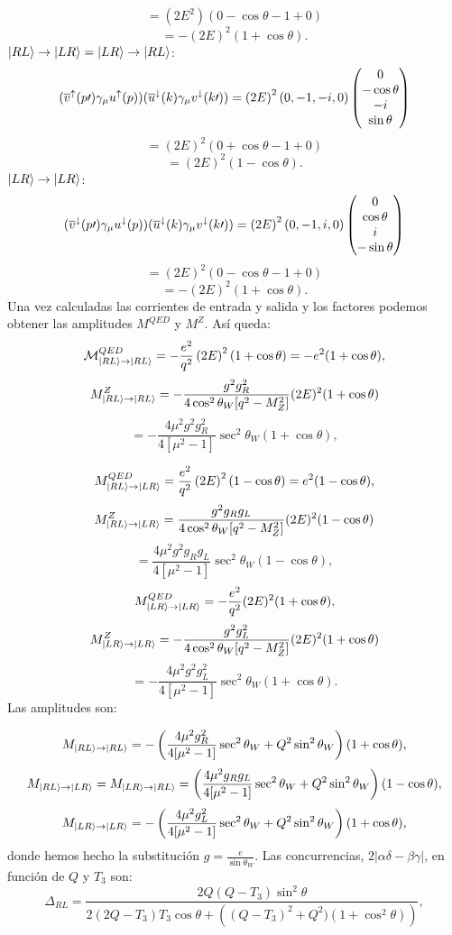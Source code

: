 \documentclass{article}
\theoremstyle{plain}
\theoremstyle{definition}
\begin{document}
	\[= (2E^2)\left(
	0-\cos\theta -1+
	0
	\right) \]	
	\[=-(2E)^2(1+\cos\theta)\text{.}\]
	\underline{\(\ket{RL}\rightarrow\ket{LR}=\ket{LR}\rightarrow\ket{RL}\)}:\newline\newline
	\[
	(\overline{v}^\uparrow(p\prime)\gamma_{\mu}u^\uparrow(p))(\overline{u}^\downarrow(k)\gamma_{\mu}v^\downarrow(k\prime)) = \left(2E\right)^2\left(0,-1,-i,0\right)\left(\begin{array}{@{}c@{}}
	0\\
	-\cos\theta\\
	-i\\
	\sin\theta
	\end{array}\right)
	\]
	\[
	=(2E)^2\left(0+\cos\theta-1+0\right)
	\]
	\[
	= (2E)^2(1-\cos\theta)\text{.}
	\]
	\underline{\(\ket{LR}\rightarrow\ket{LR}\)}:
	\[
	(\overline{v}^\downarrow(p\prime)\gamma_{\mu}u^\downarrow(p))(\overline{u}^\downarrow(k)\gamma_{\mu}v^\downarrow(k\prime)) = \left(2E\right)^2\left(0,-1,i,0\right)
\left(\begin{array}{@{}c@{}}
0\\
\cos\theta\\
i\\
-\sin\theta
\end{array}\right)
	\]
	\[= (2E)^2\left(0-\cos\theta-1+0\right) \]
	\[= -(2E)^2\left(1+\cos\theta\right) \text{.}\]
	Una vez calculadas las corrientes de entrada y salida y los factores podemos obtener las amplitudes \(M^{QED}\) y \(M^Z\). Así queda:
	\[\mathcal{M}^{QED}_{\ket{RL}\rightarrow \ket{RL}} = -\frac{e^2}{q^2}\left(2E\right)^2(1+\cos\theta) = -e^2(1+\cos\theta),\]
	\[M^Z_{\ket{RL}\rightarrow\ket{RL}} = -\frac{g^2g_R^2 }{4\cos^2\theta_W[q^2-M^2_Z]}(2E)^2(1+\cos\theta)\]
	\[= -\frac{4\mu^2 g^2g_R^2 }{4[\mu^2-1]}\sec^2\theta_W(1+\cos\theta),\]
	
	\[M^{QED}_{\ket{RL}\rightarrow\ket{LR}} = \frac{e^2}{q^2}\left(2E\right)^2(1-\cos\theta) = e^2(1-\cos\theta),\]
	\[M^Z_{\ket{RL}\rightarrow\ket{LR}} = \frac{g^2g_Rg_L }{4\cos^2\theta_W[q^2-M^2_Z]}(2E)^2(1-\cos\theta)\]
	\[=\frac{4\mu^2 g^2 g_Rg_L }{4[\mu^2-1]}\sec^2\theta_W (1-\cos\theta),\]
	\[M^{QED}_{\ket{LR}\rightarrow\ket{LR}} = -\frac{e^2}{q^2}(2E)^2(1+\cos\theta),\]
	\[M^Z_{\ket{LR}\rightarrow\ket{LR}}=-\frac{g^2g_L^2 }{4\cos^2\theta_W[q^2-M^2_Z]}(2E)^2(1+\cos\theta)\]  
	\[=-\frac{4\mu^2 g^2   g_L^2 }{4[\mu^2-1]}\sec^2\theta_W(1+\cos\theta)\text{.}\]
	Las amplitudes  son:\newline

		\[M_{\ket{RL}\rightarrow\ket{RL}}=-\left(\frac{4\mu^2 g_R^2 }{4[\mu^2-1]}\sec^2\theta_W + Q^2\sin^2\theta_W\right)(1+\cos\theta),\]
		\[M_{\ket{RL}\rightarrow\ket{LR}}= M_{\ket{LR}\rightarrow\ket{RL}}=\left(\frac{4\mu^2   g_Rg_L }{4[\mu^2-1]}\sec^2\theta_W + Q^2\sin^2\theta_W\right)(1-\cos\theta),\]
		\[M_{\ket{LR}\rightarrow\ket{LR}}= -\left(\frac{4\mu^2   g_L^2 }{4[\mu^2-1]}\sec^2\theta_W + Q^2\sin^2\theta_W\right)(1+\cos\theta),\]	
	donde hemos hecho la substitución \(g = \frac{e}{\sin\theta_W}\text{.}\)
	Las concurrencias, \(2|\alpha\delta - \beta\gamma|\), en función de \(Q\) y \(T_3\) son:
	\[\Delta_{RL}=\frac{2Q(Q-T_3)\sin^2\theta}{2(2Q-T_3)T_3\cos\theta + \left((Q-T_3)^2 + Q^2)(1+\cos^2\theta) \right)}, \]
	
\end{document}
